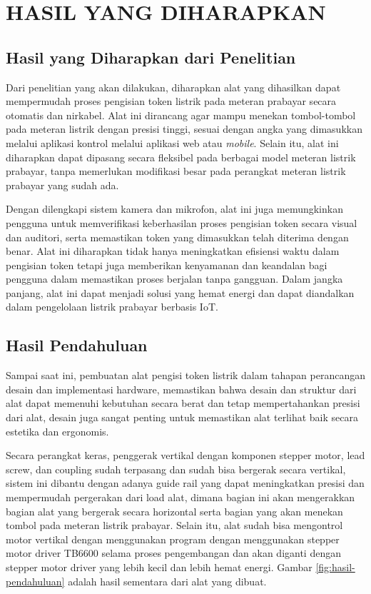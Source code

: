 \chapter{HASIL YANG DIHARAPKAN}

\section{Hasil yang Diharapkan dari Penelitian}

Dari penelitian yang akan dilakukan, diharapkan alat yang dihasilkan dapat mempermudah proses pengisian token listrik pada 
meteran prabayar secara otomatis dan nirkabel. Alat ini dirancang agar mampu menekan tombol-tombol pada meteran listrik dengan presisi tinggi, 
sesuai dengan angka yang dimasukkan melalui aplikasi kontrol melalui aplikasi web atau \textit{mobile}. Selain itu, alat ini diharapkan dapat dipasang secara fleksibel pada 
berbagai model meteran listrik prabayar, tanpa memerlukan modifikasi besar pada perangkat meteran listrik prabayar yang sudah ada.

Dengan dilengkapi sistem kamera dan mikrofon, alat ini juga memungkinkan pengguna untuk memverifikasi keberhasilan proses 
pengisian token secara visual dan auditori, serta memastikan token yang dimasukkan telah diterima dengan benar. Alat ini diharapkan 
tidak hanya meningkatkan efisiensi waktu dalam pengisian token tetapi juga memberikan kenyamanan dan keandalan bagi pengguna dalam 
memastikan proses berjalan tanpa gangguan. Dalam jangka panjang, alat ini dapat menjadi solusi yang hemat energi dan dapat diandalkan 
dalam pengelolaan listrik prabayar berbasis IoT.

\section{Hasil Pendahuluan}

Sampai saat ini, pembuatan alat pengisi token listrik dalam tahapan perancangan desain dan implementasi hardware, memastikan bahwa desain dan struktur dari alat
dapat memenuhi kebutuhan secara berat dan tetap mempertahankan presisi dari alat, desain juga sangat penting untuk memastikan alat terlihat baik secara estetika dan ergonomis.

Secara perangkat keras, penggerak vertikal dengan komponen stepper motor, lead screw, dan coupling sudah terpasang dan sudah bisa bergerak secara vertikal,
sistem ini dibantu dengan adanya guide rail yang dapat meningkatkan presisi dan mempermudah pergerakan dari load alat, dimana bagian ini akan mengerakkan
bagian alat yang bergerak secara horizontal serta bagian yang akan menekan tombol pada meteran listrik prabayar.
Selain itu, alat sudah bisa mengontrol motor vertikal dengan menggunakan program dengan menggunakan stepper motor driver TB6600 selama proses pengembangan dan akan diganti dengan stepper motor driver 
yang lebih kecil dan lebih hemat energi. Gambar \ref{fig:hasil-pendahuluan} adalah hasil sementara dari alat yang dibuat.

